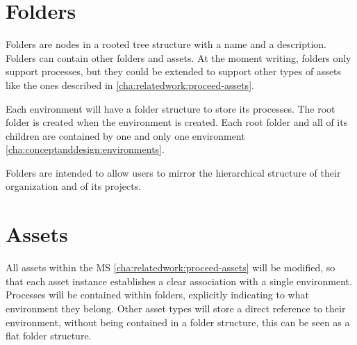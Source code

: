 \section{Folders}

Folders are nodes in a rooted tree structure with a name and a description.
Folders can contain other folders and assets.
At the moment writing, folders only support processes, but they could be extended to
support other types of assets like the ones described in \ref{cha:relatedwork:proceed-assets}.

Each environment will have a folder structure to store its processes.
The root folder is created when the environment is created.
Each root folder and all of its children are contained by one and only one environment \ref{cha:conceptanddesign:environments}.

Folders are intended to allow users to mirror the hierarchical structure of their
organization and of its projects.




\section{Assets}

All assets within the MS \ref{cha:relatedwork:proceed-assets}
will be modified, so that each asset instance establishes a clear association with a single environment.
Processes will be contained within folders, explicitly indicating to what environment they
belong.
Other asset types will store a direct reference to their environment, without being
contained in a folder structure, this can be seen as a flat folder structure.




